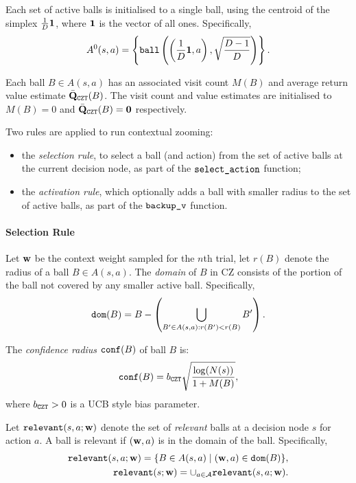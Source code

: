    Each set of active balls is initialised to a single ball, using the centroid of the simplex $\frac{1}{D}\mathbf{1}$, where $\mathbf{1}$ is the vector of all ones. Specifically, 
    \begin{align}
        A^0(s,a) = \left\{ \textnormal{\texttt{ball}}\left(\left(\frac{1}{D}\mathbf{1},a\right),\sqrt{\frac{D-1}{D}}\right) \right\}. \label{eq:5:czt_initial_ball}
    \end{align}

    Each ball $B\in A(s,a)$ has an associated visit count $M(B)$ and average return value estimate $\bar{\mathbf{Q}}_{\textnormal{\texttt{CZT}}}(B)$. The visit count and value estimates are initialised to $M(B)=0$ and $\bar{\mathbf{Q}}_{\textnormal{\texttt{CZT}}}(B)=\mathbf{0}$ respectively.

    Two rules are applied to run contextual zooming: 
    \begin{itemize}
        \item the \textit{selection rule}, to select a ball (and action) from the set of active balls at the current decision node, as part of the ${\textnormal{\texttt{select\_action}}}$ function;
        \item the \textit{activation rule}, which optionally adds a ball with smaller radius to the set of active balls, as part of the ${\textnormal{\texttt{backup\_v}}}$ function.
    \end{itemize}
    
\paragraph{Selection Rule}

    Let $\mathbf{w}$ be the context weight sampled for the $n$th trial, let $r(B)$ denote the radius of a ball $B\in A(s,a)$. The \textit{domain} of $B$ in CZ consists of the portion of the ball not covered by any smaller active ball. Specifically,
    \begin{align}
        {\textnormal{\texttt{dom}}}(B) = B - \left( \bigcup_{B'\in A(s,a):r(B')<r(B)} 
            B' \right). \label{eq:5:czt_domain}
    \end{align}

    The \textit{confidence radius} ${\textnormal{\texttt{conf}}}(B)$ of ball $B$ is:
    \begin{align}
        {\textnormal{\texttt{conf}}}(B) = b_{\textnormal{\texttt{CZT}}} \sqrt{\frac{\log(N(s))}{1+M(B)}},
            \label{eq:5:czt_conf_radius}
    \end{align}
    where $b_{\textnormal{\texttt{CZT}}}>0$ is a UCB style bias parameter.

    Let ${\textnormal{\texttt{relevant}}}(s,a;\mathbf{w})$ denote the set of \textit{relevant} balls at a decision node $s$ for action $a$. A ball is relevant if $(\mathbf{w},a)$ is in the domain of the ball. Specifically,
    \begin{align}
        {\textnormal{\texttt{relevant}}}(s,a;\mathbf{w}) = \{ B \in A(s,a) \mid (\mathbf{w},a)\in{\textnormal{\texttt{dom}}}(B)\}, \\
        {\textnormal{\texttt{relevant}}}(s;\mathbf{w}) = \cup_{a\in\mathcal{A}} {\textnormal{\texttt{relevant}}}(s,a;\mathbf{w}). \label{eq:5:relevant_balls_state}
    \end{align}

